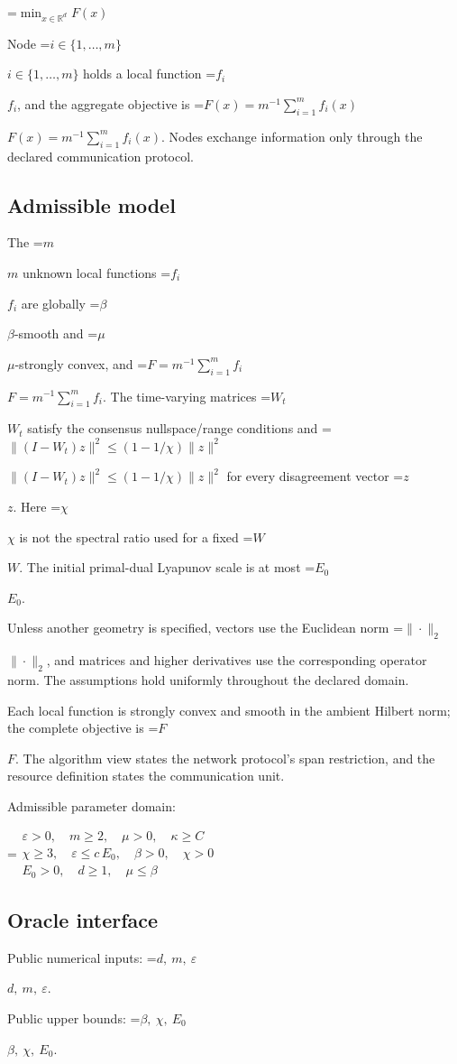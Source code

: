 \documentclass[10pt,a4paper]{article}
\newcommand{\AtlasMath}[1]{\par\begingroup\centering\setbox0=\hbox{$\displaystyle #1$}\ifdim\wd0>1.4\linewidth\typeout{ATLAS WIDE FORMULA: \the\wd0}\fi\ifdim\wd0>\linewidth\resizebox{\linewidth}{!}{\box0}\else\box0\fi\par\endgroup}
\newcommand{\AtlasInlineMath}[1]{\begingroup\setbox0=\hbox{$#1$}\ifdim\wd0>.4\linewidth\endgroup\AtlasMath{#1}\else\endgroup$#1$\fi}
\begin{document}
\AtlasMath{\min_{x\in \mathbb{R}^d}F(x)}


Node \AtlasInlineMath{i\in\{1,\ldots,m\}} holds a local function \AtlasInlineMath{f_i}, and the aggregate objective is \AtlasInlineMath{F(x)=m^{-1}\sum_{i=1}^m f_i(x)}. Nodes exchange information only through the declared communication protocol.

\subsection{Admissible model}
The \AtlasInlineMath{m} unknown local functions \AtlasInlineMath{f_i} are globally \AtlasInlineMath{\beta}-smooth and \AtlasInlineMath{\mu}-strongly convex, and \AtlasInlineMath{F=m^{-1}\sum_{i=1}^m f_i}. The time-varying matrices \AtlasInlineMath{W_t} satisfy the consensus nullspace/range conditions and \AtlasInlineMath{\|(I-W_t)z\|^2\le(1-1/\chi)\|z\|^2} for every disagreement vector \AtlasInlineMath{z}. Here \AtlasInlineMath{\chi} is not the spectral ratio used for a fixed \AtlasInlineMath{W}. The initial primal-dual Lyapunov scale is at most \AtlasInlineMath{E_0}.

Unless another geometry is specified, vectors use the Euclidean norm \AtlasInlineMath{\|\cdot\|_2}, and matrices and higher derivatives use the corresponding operator norm. The assumptions hold uniformly throughout the declared domain.

Each local function is strongly convex and smooth in the ambient Hilbert norm; the complete objective is \AtlasInlineMath{F}. The algorithm view states the network protocol's span restriction, and the resource definition states the communication unit.

Admissible parameter domain:


\AtlasMath{\begin{gathered}\varepsilon > 0,\quad m \ge 2,\quad \mu > 0,\quad \kappa \ge C\\\chi \ge 3,\quad \varepsilon \le c\,E_0,\quad \beta > 0,\quad \chi > 0\\E_0 > 0,\quad d \ge 1,\quad \mu \le \beta\end{gathered}}


\subsection{Oracle interface}
Public numerical inputs: \AtlasInlineMath{d,\ m,\ \varepsilon}.

Public upper bounds: \AtlasInlineMath{\beta,\ \chi,\ E_0}.
\end{document}
